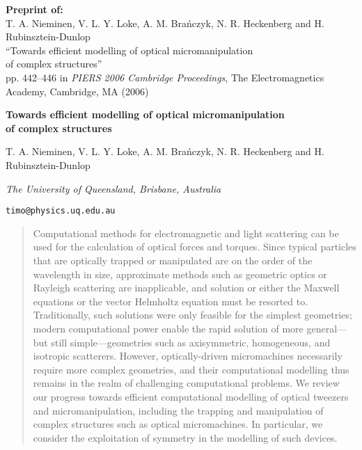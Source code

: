 

\noindent
\textbf{Preprint of:}\\
T. A. Nieminen, V. L. Y. Loke,
A. M. Bra\'{n}czyk,
N. R. Heckenberg and
H. Rubinsztein-Dunlop\\
``Towards efficient modelling of optical micromanipulation\\
of complex structures''\\
pp. 442--446 in
\textit{PIERS 2006 Cambridge Proceedings},
The Electromagnetics Academy, Cambridge, MA (2006)


\hrulefill

\begin{center}

\Large
\textbf{Towards efficient modelling of optical micromanipulation\\
of complex structures}

\normalsize
T. A. Nieminen, V. L. Y. Loke,
A. M. Bra\'{n}czyk,
N. R. Heckenberg and
H. Rubinsztein-Dunlop

\textit{The University of Queensland,
Brisbane, Australia}

\texttt{timo@physics.uq.edu.au}

\end{center}

\begin{abstract}
Computational methods for electromagnetic and light
scattering can be used for the calculation of optical
forces and torques. Since typical particles that are
optically trapped or manipulated are on the order of the
wavelength in size, approximate methods such as geometric
optics or Rayleigh scattering are inapplicable, and solution
or either the Maxwell equations or the vector Helmholtz equation
must be resorted to. Traditionally, such solutions were only
feasible for the simplest geometries; modern computational
power enable the rapid solution of more general---but still
simple---geometries such as axisymmetric, homogeneous, and
isotropic scatterers. However, optically-driven micromachines
necessarily require more complex geometries, and their
computational modelling thus remains in the realm of challenging
computational problems. We review our progress towards efficient
computational modelling of optical tweezers and micromanipulation,
including the trapping and manipulation of complex structures
such as optical micromachines. In particular,
we consider the exploitation of symmetry in the modelling
of such devices.
\end{abstract}

